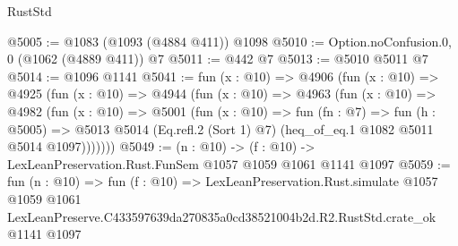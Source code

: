 \begin{lexlean}{RustStd}
\begin{coremodule}
@5005 := @1083 (@1093 (@4884 @411)) @1098
@5010 := Option.noConfusion.{0, 0} (@1062 (@4889 @411)) @7
@5011 := @442 @7
@5013 := @5010 @5011 @7
@5014 := @1096 @1141
@5041 := fun (x : @10) =>
  @4906
    (fun (x : @10) =>
    @4925
      (fun (x : @10) =>
      @4944
        (fun (x : @10) =>
        @4963
          (fun (x : @10) =>
          @4982
            (fun (x : @10) =>
            @5001
              (fun (x : @10) =>
              fun (fn : @7) =>
              fun (h : @5005) =>
              @5013 @5014 (Eq.refl.{2} (Sort 1) @7) (heq_of_eq.{1} @1082 @5011 @5014 @1097)))))))
@5049 := (n : @10) -> (f : @10) -> LexLeanPreservation.Rust.FunSem @1057 @1059 @1061 @1141 @1097
@5059 := fun (n : @10) =>
  fun (f : @10) =>
  LexLeanPreservation.Rust.simulate
    @1057
    @1059
    @1061
    LexLeanPreserve.C433597639da270835a0cd38521004b2d.R2.RustStd.crate_ok
    @1141
    @1097
\end{coremodule}
\end{lexlean}

